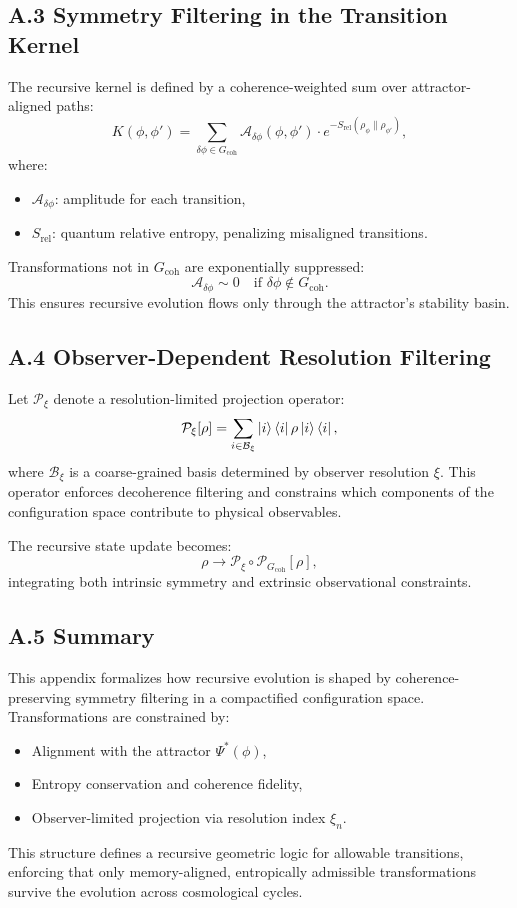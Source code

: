 \subsection*{A.3 Symmetry Filtering in the Transition Kernel}

The recursive kernel is defined by a coherence-weighted sum over attractor-aligned paths:
\[
K(\phi, \phi') = \sum_{\delta \phi \in G_{\text{coh}}} \mathcal{A}_{\delta \phi}(\phi, \phi') \cdot e^{-S_{\text{rel}}(\rho_\phi \| \rho_{\phi'})},
\]
where:
\begin{itemize}
  \item \( \mathcal{A}_{\delta \phi} \): amplitude for each transition,
  \item \( S_{\text{rel}} \): quantum relative entropy, penalizing misaligned transitions.
\end{itemize}

Transformations not in \( G_{\text{coh}} \) are exponentially suppressed:
\[
\mathcal{A}_{\delta \phi} \sim 0 \quad \text{if } \delta \phi \notin G_{\text{coh}}.
\]
This ensures recursive evolution flows only through the attractor’s stability basin.

\subsection*{A.4 Observer-Dependent Resolution Filtering}

Let \( \mathcal{P}_\xi \) denote a resolution-limited projection operator:
\[
\mathcal{P}_\xi[\rho] = \sum_{i \in \mathcal{B}_\xi} \ket{i}\bra{i} \rho \ket{i}\bra{i},
\]
where \( \mathcal{B}_\xi \) is a coarse-grained basis determined by observer resolution \( \xi \). This operator enforces decoherence filtering and constrains which components of the configuration space contribute to physical observables.

The recursive state update becomes:
\[
\rho \to \mathcal{P}_\xi \circ \mathcal{P}_{G_{\text{coh}}}[\rho],
\]
integrating both intrinsic symmetry and extrinsic observational constraints.

\subsection*{A.5 Summary}

This appendix formalizes how recursive evolution is shaped by coherence-preserving symmetry filtering in a compactified configuration space. Transformations are constrained by:
\begin{itemize}
  \item Alignment with the attractor \( \Psi^*(\phi) \),
  \item Entropy conservation and coherence fidelity,
  \item Observer-limited projection via resolution index \( \xi_n \).
\end{itemize}

This structure defines a recursive geometric logic for allowable transitions, enforcing that only memory-aligned, entropically admissible transformations survive the evolution across cosmological cycles.
